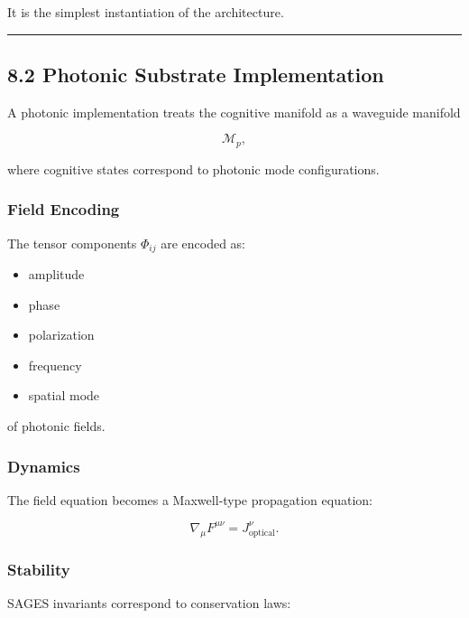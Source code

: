 It is the simplest instantiation of the architecture.

\begin{center}\rule{0.5\linewidth}{0.5pt}\end{center}

\subsection{8.2 Photonic Substrate Implementation}\label{photonic-substrate-implementation}

A photonic implementation treats the cognitive manifold as a waveguide manifold

\[
\mathcal{M}_p,
\]

where cognitive states correspond to photonic mode configurations.

\subsubsection{Field Encoding}\label{field-encoding}

The tensor components \(\Phi_{ij}\) are encoded as:

\begin{itemize}
\tightlist
\item
  amplitude\\
\item
  phase\\
\item
  polarization\\
\item
  frequency\\
\item
  spatial mode
\end{itemize}

of photonic fields.

\subsubsection{Dynamics}\label{dynamics}

The field equation becomes a Maxwell‑type propagation equation:

\[
\nabla_{\mu} F^{\mu\nu} = J^\nu_{\text{optical}}.
\]

\subsubsection{Stability}\label{stability-1}

SAGES invariants correspond to conservation laws:

